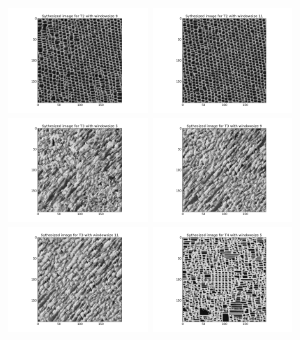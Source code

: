 \documentclass{extarticle}
\theoremstyle{definition}
\theoremstyle{definition}
\begin{document}
\begin{figure}[H]
	\includegraphics[width = 0.33\textwidth]{./figures/Syth_T2_size_9.png}
	\includegraphics[width = 0.33\textwidth]{./figures/Syth_T2_size_11.png}
	\includegraphics[width = 0.33\textwidth]{./figures/Syth_T3_size_5.png}
	\includegraphics[width = 0.33\textwidth]{./figures/Syth_T3_size_9.png}
	\includegraphics[width = 0.33\textwidth]{./figures/Syth_T3_size_11.png}
	\includegraphics[width = 0.33\textwidth]{./figures/Syth_T4_size_5.png}

\end{figure}
\end{document}
